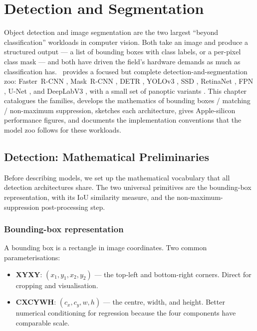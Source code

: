 \chapter{Detection and Segmentation}
\label{ch:detection_segmentation}

Object detection and image segmentation are the two largest
``beyond classification'' workloads in computer vision. Both
take an image and produce a structured output --- a list of
bounding boxes with class labels, or a per-pixel class mask ---
and both have driven the field's hardware demands as much as
classification has. \Lucid\ provides a focused but complete
detection-and-segmentation zoo: Faster~R-CNN
\cite{ren_faster_rcnn_2015}, Mask~R-CNN \cite{he_mask_rcnn_2017},
DETR \cite{carion_detr_2020}, YOLOv3 \cite{redmon_yolov3_2018},
SSD \cite{liu_ssd_2016}, RetinaNet \cite{lin_focal_2017}, FPN
\cite{lin_fpn_2017}, U-Net \cite{ronneberger_unet_2015}, and
DeepLabV3 \cite{chen_deeplab_2017}, with a small set of
panoptic variants \cite{kirillov_panoptic_2019}. This chapter
catalogues the families, develops the mathematics of bounding
boxes / matching / non-maximum suppression, sketches each
architecture, gives Apple-silicon performance figures, and
documents the implementation conventions that the model zoo
follows for these workloads.

\section{Detection: Mathematical Preliminaries}
\label{sec:detection_segmentation:preliminaries}

Before describing models, we set up the mathematical vocabulary
that all detection architectures share. The two universal
primitives are the bounding-box representation, with its IoU
similarity measure, and the non-maximum-suppression
post-processing step.

\subsection{Bounding-box representation}
\label{ssec:detection_segmentation:bbox_repr}

A bounding box is a rectangle in image coordinates. Two common
parameterisations:

\begin{itemize}
  \item \textbf{XYXY}: $(x_1, y_1, x_2, y_2)$ --- the top-left
    and bottom-right corners. Direct for cropping and
    visualisation.
  \item \textbf{CXCYWH}: $(c_x, c_y, w, h)$ --- the centre,
    width, and height. Better numerical conditioning for
    regression because the four components have comparable
    scale.
\end{itemize}

